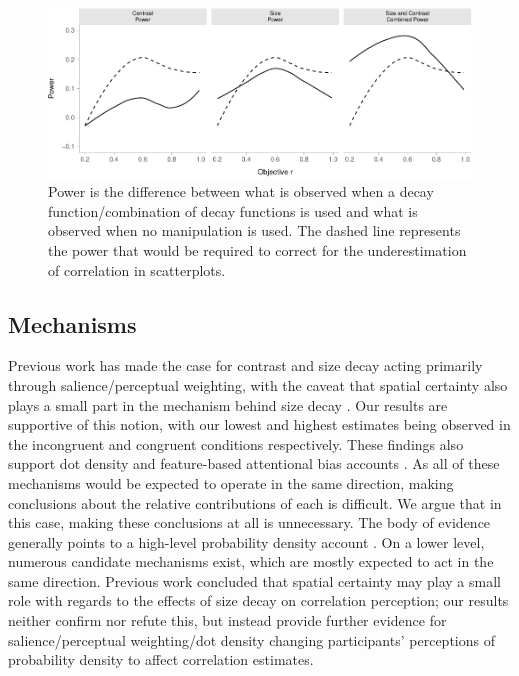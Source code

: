 \documentclass[manuscript, anonymous, screen]{acmart}
\begin{document}
\begin{figure}

{\centering \includegraphics[width=1\textwidth,height=\textheight]{size_and_contrast_new_files/figure-pdf/fig-power-plot-1.pdf}

}

\caption{\label{fig-power-plot}Power is the difference between what is
observed when a decay function/combination of decay functions is used
and what is observed when no manipulation is used. The dashed line
represents the power that would be required to correct for the
underestimation of correlation in scatterplots.}

\end{figure}

\hypertarget{sec-mechs}{%
\subsection{Mechanisms}\label{sec-mechs}}

Previous work has made the case for contrast and size decay acting
primarily through salience/perceptual weighting, with the caveat that
spatial certainty also plays a small part in the mechanism behind size
decay \citep{strain_2023, strain_2023b}. Our results are supportive of
this notion, with our lowest and highest estimates being observed in the
incongruent and congruent conditions respectively. These findings also
support dot density \citep{yang_2023} and feature-based attentional bias
accounts \citep{hong_2021, sun_2016}. As all of these mechanisms would
be expected to operate in the same direction, making conclusions about
the relative contributions of each is difficult. We argue that in this
case, making these conclusions at all is unnecessary. The body of
evidence generally points to a high-level probability density account
\citep{rensink_2017, rensink_2022}. On a lower level, numerous candidate
mechanisms exist, which are mostly expected to act in the same
direction. Previous work concluded that spatial certainty
\citep{strain_2023b} may play a small role with regards to the effects
of size decay on correlation perception; our results neither confirm nor
refute this, but instead provide further evidence for
salience/perceptual weighting/dot density changing participants'
perceptions of probability density to affect correlation estimates.
\end{document}
